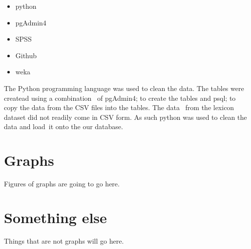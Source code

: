 \documentclass[12pt,a4paper]{article}
\begin{document}
    \begin{itemize}
        \item python
        \item pgAdmin4
        \item SPSS
        \item Github
        \item weka
    \end{itemize}
    The Python programming language was used to clean the data. The tables were createad using a combination \
    of pgAdmin4; to create the tables and psql; to copy the data from the CSV files into the tables. The data \
    from the lexicon dataset did not readily come in CSV form.  As such python was used to clean the data and load\
    it onto the our database.

    \begin{appendices}
        \section{Graphs}
        Figures of graphs are going to go here.
        \section{Something else}
        Things that are not graphs will go here.
    \end{appendices}
\end{document}
